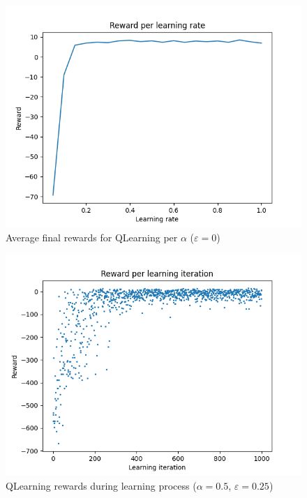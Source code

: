 \documentclass[11pt]{article}
\def\greedyeps{0}
\begin{document}
\begin{figure}[H]
	\centering
	\includegraphics[width=12cm]{../figures/part_1/learning_reward_qlearning_alpha_search.png}
	\caption{Average final rewards for QLearning per $\alpha$ ($\varepsilon = \greedyeps$)}
	\label{fig:qlearning_alph_search}
\end{figure}

\begin{figure}[H]
	\centering
	\includegraphics[width=12cm]{../figures/part_1/learning_reward_base_qlearning.png}
	\caption{QLearning rewards during learning process ($\alpha = 0.5$, $\varepsilon = 0.25$)}
	\label{fig:qlearning_base_reward}
\end{figure}
\end{document}
